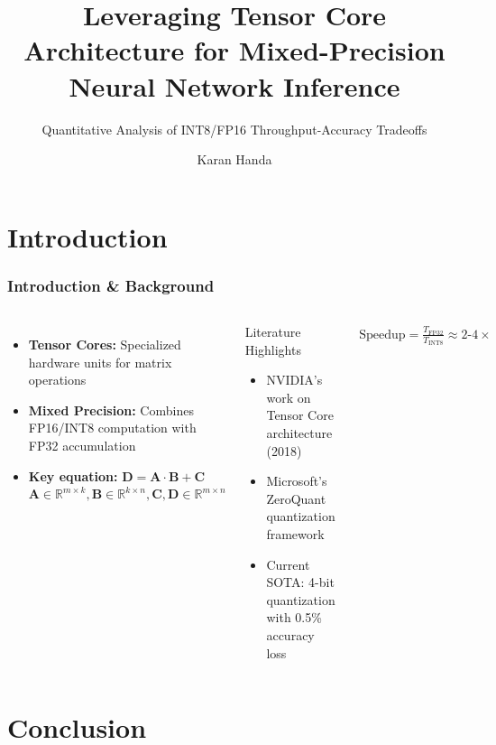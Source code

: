 \documentclass[
    9pt,
    aspectratio=169,
]{beamer}
\title[Tensor Core Optimization]{Leveraging Tensor Core Architecture for Mixed-Precision Neural Network Inference}
\subtitle[Quantization Effects]{Quantitative Analysis of INT8/FP16 Throughput-Accuracy Tradeoffs}
\author[Karan Handa]{Karan Handa}
\institute[]{Department of Computer Science, Ashoka University}
\begin{document}
\begin{frame}
\titlepage
\end{frame}

\section{Introduction}

\begin{frame}
\frametitle{Introduction \& Background}
\begin{columns}
\begin{itemize}
    \item \textbf{Tensor Cores:} Specialized hardware units for matrix operations
    \item \textbf{Mixed Precision:} Combines FP16/INT8 computation with FP32 accumulation
    \item \textbf{Key equation:} $\mathbf{D} = \mathbf{A} \cdot \mathbf{B} + \mathbf{C}$ \quad {} $\mathbf{A} \in \mathbb{R}^{m \times k}, \mathbf{B} \in \mathbb{R}^{k \times n}, \mathbf{C}, \mathbf{D} \in \mathbb{R}^{m \times n}$
\end{itemize}

\begin{block}{Literature Highlights}
    \begin{itemize}
        \item NVIDIA's work on Tensor Core architecture (2018)
        \item Microsoft's ZeroQuant quantization framework
        \item Current SOTA: 4-bit quantization with 0.5\% accuracy loss
    \end{itemize}
\end{block}

\begin{align}
    \text{Speedup} = \frac{T_{\text{FP32}}}{T_{\text{INT8}}} \approx 2\text{-}4\times
\end{align}

\end{columns}
\end{frame}

\section{Conclusion}
\end{document}
